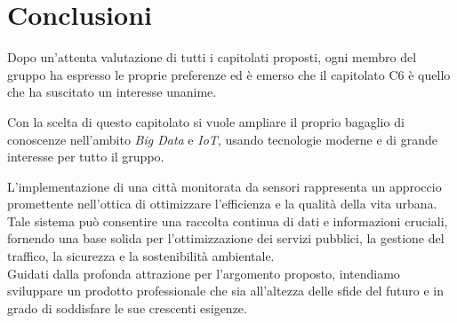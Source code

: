 \documentclass{article}
\begin{document}
\flushleft
\section{Conclusioni}
Dopo un'attenta valutazione di tutti i capitolati proposti, ogni membro del gruppo ha espresso le proprie preferenze ed è emerso che il capitolato C6 è quello che ha suscitato un interesse unanime.

Con la scelta di questo capitolato si vuole ampliare il proprio bagaglio di conoscenze nell’ambito \textit{Big Data} e \textit{IoT}, usando tecnologie moderne e di grande interesse per tutto il gruppo.

L'implementazione di una città monitorata da sensori rappresenta un approccio promettente nell'ottica di ottimizzare l'efficienza e la qualità della vita urbana. Tale sistema può consentire una raccolta continua di dati e informazioni cruciali, fornendo una base solida per l'ottimizzazione dei servizi pubblici, la gestione del traffico, la sicurezza e la sostenibilità ambientale. \\
Guidati dalla profonda attrazione per l'argomento proposto, intendiamo sviluppare un prodotto professionale che sia all'altezza delle sfide del futuro e in grado di soddisfare le sue crescenti esigenze.
\end{document}
